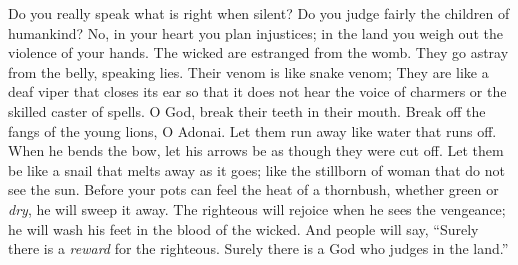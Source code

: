 \begin{biblechapter} %
 Do you really speak what is right when silent? 
Do you judge fairly the children of humankind?
\verse No, in your heart you plan injustices; 
in the land you weigh out the violence of your hands.
\verse The wicked are estranged from the womb. 
They go astray from the belly, speaking lies.
\verse Their venom is like snake venom; 
They are like a deaf viper that closes its ear
\verse so that it does not hear the voice of charmers 
or the skilled caster of spells.
\verse O God, break their teeth in their mouth. 
Break off the fangs of the young lions, O Adonai.
\verse Let them run away like water that runs off. 
When he bends the bow, let his arrows be as though they were cut off.
\verse Let them be like a snail that melts away as it goes; 
like the stillborn of woman that do not see the sun.
\verse Before your pots can feel the heat of a thornbush, 
whether green or \textit{dry}, he will sweep it away.
\verse The righteous will rejoice when he sees the vengeance; 
he will wash his feet in the blood of the wicked.
\verse And people will say, “Surely there is a \textit{reward} for the righteous. 
Surely there is a God who judges in the land.”
\end{biblechapter}

